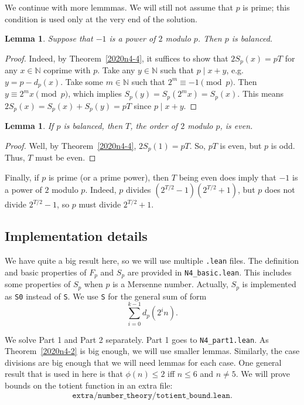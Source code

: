 \documentclass{article}
\newtheorem{lemma}[theorem]{Lemma}
\newcommand{\N}{\mathbb{N}}
\begin{document}
We continue with more lemmmas.
We will still not assume that $p$ is prime; this condition is used only at the very end of the solution.

\begin{lemma}\label{2020n4-5}
Suppose that $-1$ is a power of $2$ modulo $p$.
Then $p$ is balanced.
\end{lemma}
\begin{proof}
Indeed, by Theorem~\ref{2020n4-4}, it suffices to show that $2 S_p(x) = pT$ for any $x \in \N$ coprime with $p$.
Take any $y \in \N$ such that $p \mid x + y$, e.g. $y = p - d_p(x)$.
Take some $m \in \N$ such that $2^m \equiv -1 \pmod{p}$.
Then $y \equiv 2^m x \pmod{p}$, which implies $S_p(y) = S_p(2^m x) = S_p(x)$.
This means $2 S_p(x) = S_p(x) + S_p(y) = pT$ since $p \mid x + y$.
\end{proof}

\begin{lemma}\label{2020n4-6}
If $p$ is balanced, then $T$, the order of $2$ modulo $p$, is even.
\end{lemma}
\begin{proof}
Well, by Theorem~\ref{2020n4-4}, $2 S_p(1) = pT$.
So, $pT$ is even, but $p$ is odd.
Thus, $T$ must be even.
\end{proof}

Finally, if $p$ is prime (or a prime power), then $T$ being even does imply that $-1$ is a power of $2$ modulo $p$.
Indeed, $p$ divides $(2^{T/2} - 1)(2^{T/2} + 1)$, but $p$ does not divide $2^{T/2} - 1$, so $p$ must divide $2^{T/2} + 1$.



\subsection*{Implementation details}

We have quite a big result here, so we will use multiple \texttt{.lean} files.
The definition and basic properties of $F_p$ and $S_p$ are provided in \texttt{N4\_basic.lean}.
This includes some properties of $S_p$ when $p$ is a Mersenne number.
Actually, $S_p$ is implemented as \texttt{S0} instead of \texttt{S}.
We use \texttt{S} for the general sum of form
\[ \sum_{i = 0}^{k - 1} d_p(2^i n). \]

We solve Part 1 and Part 2 separately.
Part 1 goes to \texttt{N4\_part1.lean}.
As Theorem~\ref{2020n4-2} is big enough, we will use smaller lemmas.
Similarly, the case divisions are big enough that we will need lemmas for each case.
One general result that is used in here is that $\phi(n) \leq 2$ iff $n \leq 6$ and $n \neq 5$.
We will prove bounds on the totient function in an extra file:
\[ \texttt{extra/number\_theory/totient\_bound.lean}. \]
\end{document}
